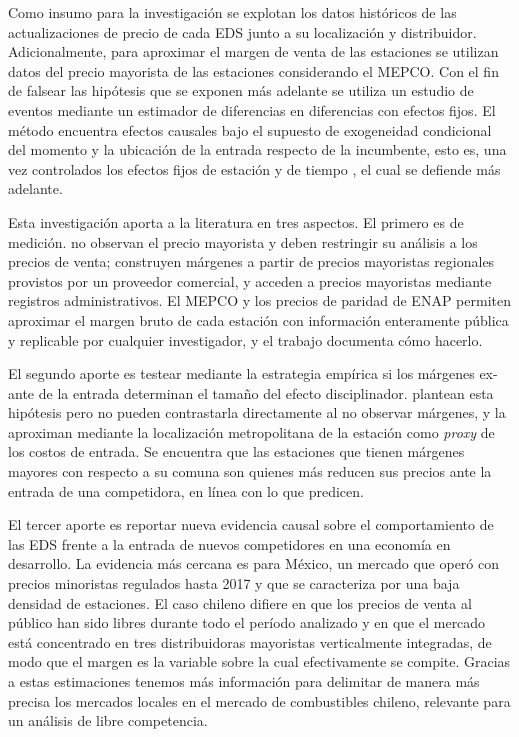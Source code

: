 Como insumo para la investigación se explotan los datos históricos de las actualizaciones de precio de cada EDS junto a su localización y distribuidor. Adicionalmente, para aproximar el margen de venta de las estaciones se utilizan datos del precio mayorista de las estaciones considerando el MEPCO. Con el fin de falsear las hipótesis que se exponen más adelante se utiliza un estudio de eventos mediante un estimador de diferencias en diferencias con efectos fijos. El método encuentra efectos causales bajo el supuesto de exogeneidad condicional del momento y la ubicación de la entrada respecto de la incumbente, esto es, una vez controlados los efectos fijos de estación y de tiempo \parencite{ARCIDIACONO2020}, el cual se defiende más adelante.

Esta investigación aporta a la literatura en tres aspectos. El primero es de medición. \textcite{KOH2022} no observan el precio mayorista y deben restringir su análisis a los precios de venta; \textcite{FISCHER2025} construyen márgenes a partir de precios mayoristas regionales provistos por un proveedor comercial, y \textcite{DAVIS2025} acceden a precios mayoristas mediante registros administrativos. El MEPCO y los precios de paridad de ENAP permiten aproximar el margen bruto de cada estación con información enteramente pública y replicable por cualquier investigador, y el trabajo documenta cómo hacerlo.

El segundo aporte es testear mediante la estrategia empírica si los márgenes ex-ante de la entrada determinan el tamaño del efecto disciplinador. \textcite{KOH2022} plantean esta hipótesis pero no pueden contrastarla directamente al no observar márgenes, y la aproximan mediante la localización metropolitana de la estación como \textit{proxy} de los costos de entrada. Se encuentra que las estaciones que tienen márgenes mayores con respecto a su comuna son quienes más reducen sus precios ante la entrada de una competidora, en línea con lo que predicen.

El tercer aporte es reportar nueva evidencia causal sobre el comportamiento de las EDS frente a la entrada de nuevos competidores en una economía en desarrollo. La evidencia más cercana es \textcite{DAVIS2025} para México, un mercado que operó con precios minoristas regulados hasta 2017 y que se caracteriza por una baja densidad de estaciones. El caso chileno difiere en que los precios de venta al público han sido libres durante todo el período analizado y en que el mercado está concentrado en tres distribuidoras mayoristas verticalmente integradas, de modo que el margen es la variable sobre la cual efectivamente se compite. Gracias a estas estimaciones tenemos más información para delimitar de manera más precisa los mercados locales en el mercado de combustibles chileno, relevante para un análisis de libre competencia. 